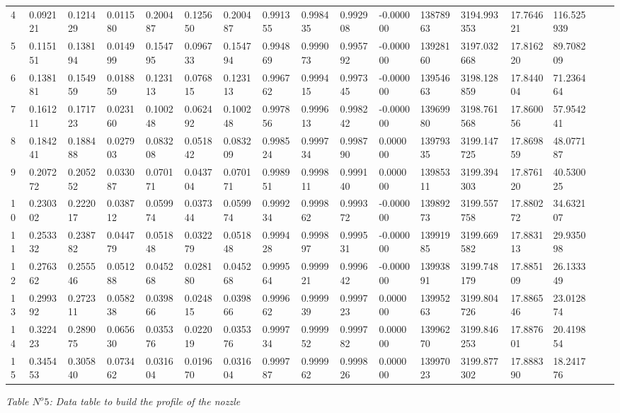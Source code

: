 \begin{center}
\begin{tabular}{|l*{16}{l|}}
4 & 0.092121 & 0.121429 & 0.011580 & 0.200487 & 0.125650 & 0.200487 & 0.991355 & 0.998435 & 0.992908 & -0.000000 & 13878963 & 3194.993353 & 17.764621 & 116.525939 \\
5 & 0.115151 & 0.138194 & 0.014999 & 0.154795 & 0.096733 & 0.154794 & 0.994869 & 0.999073 & 0.995792 & -0.000000 & 13928160 & 3197.032668 & 17.816220 & 89.708209 \\
6 & 0.138181 & 0.154959 & 0.018859 & 0.123113 & 0.076815 & 0.123113 & 0.996762 & 0.999415 & 0.997345 & -0.000000 & 13954663 & 3198.128859 & 17.844004 & 71.236464 \\
7 & 0.161211 & 0.171723 & 0.023160 & 0.100248 & 0.062492 & 0.100248 & 0.997856 & 0.999613 & 0.998242 & -0.000000 & 13969980 & 3198.761568 & 17.860056 & 57.954241 \\
8 & 0.184241 & 0.188488 & 0.027903 & 0.083208 & 0.051842 & 0.083209 & 0.998524 & 0.999734 & 0.998790 & 0.000000 & 13979335 & 3199.147725 & 17.869859 & 48.077187 \\
9 & 0.207272 & 0.205252 & 0.033087 & 0.070171 & 0.043704 & 0.070171 & 0.998951 & 0.999811 & 0.999140 & 0.000000 & 13985311 & 3199.394303 & 17.876120 & 40.530025 \\
10 & 0.230302 & 0.222017 & 0.038712 & 0.059974 & 0.037344 & 0.059974 & 0.999234 & 0.999862 & 0.999372 & -0.000000 & 13989273 & 3199.557758 & 17.880272 & 34.632107 \\
11 & 0.253332 & 0.238782 & 0.044779 & 0.051848 & 0.032279 & 0.051848 & 0.999428 & 0.999897 & 0.999531 & -0.000000 & 13991985 & 3199.669582 & 17.883113 & 29.935098 \\
12 & 0.276362 & 0.255546 & 0.051288 & 0.045268 & 0.028180 & 0.045268 & 0.999564 & 0.999921 & 0.999642 & -0.000000 & 13993891 & 3199.748179 & 17.885109 & 26.133349 \\
13 & 0.299392 & 0.272311 & 0.058238 & 0.039866 & 0.024815 & 0.039866 & 0.999662 & 0.999939 & 0.999723 & 0.000000 & 13995263 & 3199.804726 & 17.886546 & 23.012874 \\
14 & 0.322423 & 0.289075 & 0.065630 & 0.035376 & 0.022019 & 0.035376 & 0.999734 & 0.999952 & 0.999782 & 0.000000 & 13996270 & 3199.846253 & 17.887601 & 20.419854 \\
15 & 0.345453 & 0.305840 & 0.073462 & 0.031604 & 0.019670 & 0.031604 & 0.999787 & 0.999962 & 0.999826 & 0.000000 & 13997023 & 3199.877302 & 17.888390 & 18.241776 \\
\hline
\end{tabular}
\end{center}
\begin{flushright}
\textit{ Table $N^o 5$: Data table to build the profile of the nozzle } \\
\end{flushright}
